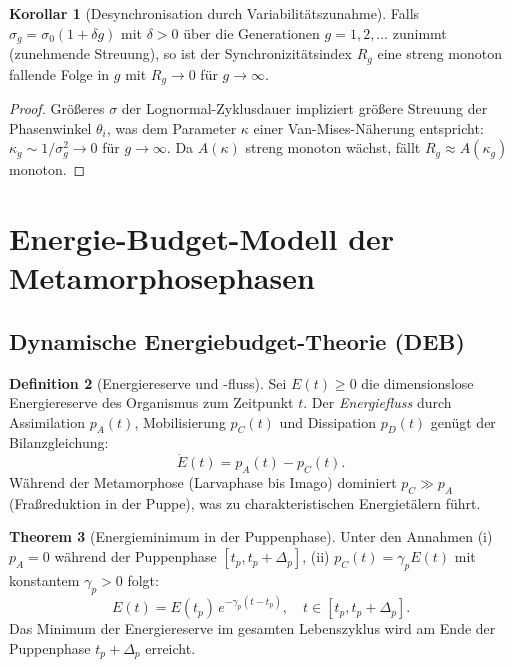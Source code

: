 ﻿\documentclass[12pt, a4paper]{article}
\theoremstyle{definition}
\newtheorem{theorem}{Theorem}[section]
\newtheorem{korollar}[theorem]{Korollar}
\newtheorem{definition}[theorem]{Definition}
\begin{document}
\begin{korollar}[Desynchronisation durch Variabilitätszunahme]
\label{cor:desynchronisation}
Falls $\sigma_g = \sigma_0 (1 + \delta g)$ mit $\delta > 0$ über die Generationen
$g = 1, 2, \ldots$ zunimmt (zunehmende Streuung), so ist der Synchronizitätsindex
$R_g$ eine streng monoton fallende Folge in $g$ mit $R_g \to 0$ für $g \to \infty$.
\end{korollar}

\begin{proof}
Größeres $\sigma$ der Lognormal-Zyklusdauer impliziert größere Streuung der
Phasenwinkel $\theta_i$, was dem Parameter $\kappa$ einer Van-Mises-Näherung
entspricht: $\kappa_g \sim 1/\sigma_g^2 \to 0$ für $g \to \infty$. Da $A(\kappa)$
streng monoton wächst, fällt $R_g \approx A(\kappa_g)$ monoton. \hfill
\end{proof}

\section{Energie-Budget-Modell der Metamorphosephasen}

\subsection{Dynamische Energiebudget-Theorie (DEB)}

\begin{definition}[Energiereserve und -fluss]\label{def:deb}
Sei $E(t) \geq 0$ die dimensionslose Energiereserve des Organismus zum Zeitpunkt $t$.
Der \emph{Energiefluss} durch Assimilation $p_A(t)$, Mobilisierung $p_C(t)$
und Dissipation $p_D(t)$ genügt der Bilanzgleichung:
\[
  \dot{E}(t) = p_A(t) - p_C(t).
\]
Während der Metamorphose (Larvaphase bis Imago) dominiert $p_C \gg p_A$ (Fraßreduktion
in der Puppe), was zu charakteristischen Energietälern führt.
\end{definition}

\begin{theorem}[Energieminimum in der Puppenphase]\label{thm:energie-minimum}
Unter den Annahmen (i) $p_A = 0$ während der Puppenphase $[t_p, t_p + \Delta_p]$,
(ii) $p_C(t) = \gamma_p E(t)$ mit konstantem $\gamma_p > 0$ folgt:
\[
  E(t) = E(t_p)\,e^{-\gamma_p(t - t_p)}, \quad t \in [t_p, t_p + \Delta_p].
\]
Das Minimum der Energiereserve im gesamten Lebenszyklus wird am Ende der
Puppenphase $t_p + \Delta_p$ erreicht.
\end{theorem}
\end{document}
